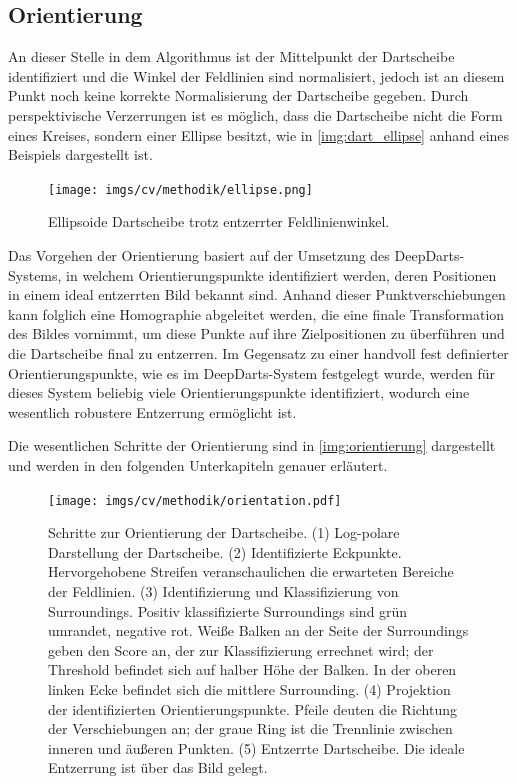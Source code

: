 \subsection{Orientierung}
\label{sec:orientierung}

An dieser Stelle in dem Algorithmus ist der Mittelpunkt der Dartscheibe identifiziert und die Winkel der Feldlinien sind normalisiert, jedoch ist an diesem Punkt noch keine korrekte Normalisierung der Dartscheibe gegeben. Durch perspektivische Verzerrungen ist es möglich, dass die Dartscheibe nicht die Form eines Kreises, sondern einer Ellipse besitzt, wie in \autoref{img:dart_ellipse} anhand eines Beispiels dargestellt ist.

\begin{figure}
    \centering
    \texttt{[image: imgs/cv/methodik/ellipse.png]}
    \caption{Ellipsoide Dartscheibe trotz entzerrter Feldlinienwinkel.}
    \label{img:dart_ellipse}
\end{figure}

Das Vorgehen der Orientierung basiert auf der Umsetzung des DeepDarts-Systems, in welchem Orientierungspunkte identifiziert werden, deren Positionen in einem ideal entzerrten Bild bekannt sind. Anhand dieser Punktverschiebungen kann folglich eine Homographie abgeleitet werden, die eine finale Transformation des Bildes vornimmt, um diese Punkte auf ihre Zielpositionen zu überführen und die Dartscheibe final zu entzerren. Im Gegensatz zu einer handvoll fest definierter Orientierungspunkte, wie es im DeepDarts-System festgelegt wurde, werden für dieses System beliebig viele Orientierungspunkte identifiziert, wodurch eine wesentlich robustere Entzerrung ermöglicht ist.

Die wesentlichen Schritte der Orientierung sind in \autoref{img:orientierung} dargestellt und werden in den folgenden Unterkapiteln genauer erläutert.

\begin{figure}
    \centering
    \texttt{[image: imgs/cv/methodik/orientation.pdf]}
    \caption{Schritte zur Orientierung der Dartscheibe. (1) Log-polare Darstellung der Dartscheibe. (2) Identifizierte Eckpunkte. Hervorgehobene Streifen veranschaulichen die erwarteten Bereiche der Feldlinien. (3) Identifizierung und Klassifizierung von Surroundings. Positiv klassifizierte Surroundings sind grün umrandet, negative rot. Weiße Balken an der Seite der Surroundings geben den Score an, der zur Klassifizierung errechnet wird; der Threshold befindet sich auf halber Höhe der Balken. In der oberen linken Ecke befindet sich die mittlere Surrounding. (4) Projektion der identifizierten Orientierungspunkte. Pfeile deuten die Richtung der Verschiebungen an; der graue Ring ist die Trennlinie zwischen inneren und äußeren Punkten. (5) Entzerrte Dartscheibe. Die ideale Entzerrung ist über das Bild gelegt.}
    \label{img:orientierung}
\end{figure}

